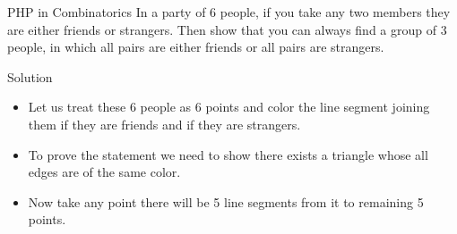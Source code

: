 \begin{frame}{PHP in Combinatorics}
    In a party of 6 people, if you take any two members they are either friends or strangers. Then show that you can always find a group of 3 people, in which all pairs are either friends or all pairs are strangers.
\end{frame}

\begin{frame}{Solution}
    \begin{itemize}[<+->]
        \item Let us treat these 6 people as 6 points and color the line segment joining them {\color{blue}{blue}} if they are friends and {\color{red}{red}} if they are strangers.

        \item To prove the statement we need to show there exists a triangle whose all edges are of the same color.
        \item Now take any point there will be 5 line segments from it to remaining 5 points.
        \begin{figure}
            \centering
        \end{figure}
    \end{itemize}
\end{frame}

